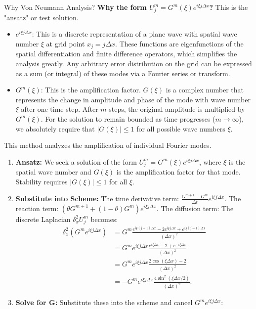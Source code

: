 \begin{solution}
\begin{remarkbox}{Why Von Neumann Analysis?}
\textbf{Why the form $U_j^m = G^m(\xi) e^{i\xi j \Delta x}$?} This is the "ansatz" or test solution.
\begin{itemize}
    \item $e^{i\xi j \Delta x}$: This is a discrete representation of a plane wave with spatial wave number $\xi$ at grid point $x_j = j\Delta x$. These functions are eigenfunctions of the spatial differentiation and finite difference operators, which simplifies the analysis greatly. Any arbitrary error distribution on the grid can be expressed as a sum (or integral) of these modes via a Fourier series or transform.
    \item $G^m(\xi)$: This is the amplification factor. $G(\xi)$ is a complex number that represents the change in amplitude and phase of the mode with wave number $\xi$ after one time step. After $m$ steps, the original amplitude is multiplied by $G^m(\xi)$. For the solution to remain bounded as time progresses ($m \to \infty$), we absolutely require that $|G(\xi)| \leq 1$ for all possible wave numbers $\xi$.
\end{itemize}
\end{remarkbox}
This method analyzes the amplification of individual Fourier modes.
\begin{enumerate}
    \item \textbf{Ansatz:} We seek a solution of the form $U_j^m = G^m(\xi) e^{i\xi j \Delta x}$, where $\xi$ is the spatial wave number and $G(\xi)$ is the amplification factor for that mode. Stability requires $|G(\xi)| \leq 1$ for all $\xi$.
    \item \textbf{Substitute into Scheme:}
    The time derivative term: $\frac{G^{m+1}-G^m}{\Delta t} e^{i\xi j \Delta x}$.
    The reaction term: $(\theta G^{m+1} + (1-\theta)G^m) e^{i\xi j \Delta x}$.
    The diffusion term: The discrete Laplacian $\delta_x^2 U_j^m$ becomes:
    \begin{align*}
    \delta_x^2 (G^m e^{i\xi j \Delta x}) &= G^m \frac{e^{i\xi (j+1) \Delta x} - 2e^{i\xi j \Delta x} + e^{i\xi (j-1) \Delta x}}{(\Delta x)^2} \\
    &= G^m e^{i\xi j \Delta x} \frac{e^{i\xi \Delta x} - 2 + e^{-i\xi \Delta x}}{(\Delta x)^2} \\
    &= G^m e^{i\xi j \Delta x} \frac{2\cos(\xi \Delta x) - 2}{(\Delta x)^2} \\
    &= -G^m e^{i\xi j \Delta x} \frac{4\sin^2(\xi \Delta x / 2)}{(\Delta x)^2}.
    \end{align*}
    \item \textbf{Solve for G:} Substitute these into the scheme and cancel $G^m e^{i\xi j\Delta x}$:

\end{enumerate}
\end{solution}
